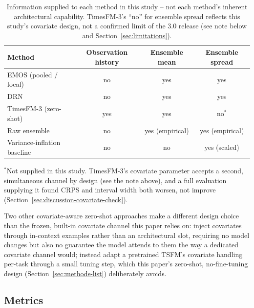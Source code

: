 \begin{table}[htbp]
\centering
\caption{Information supplied to each method in this study -- not each
method's inherent architectural capability. TimesFM-3's ``no'' for
ensemble spread reflects this study's covariate design, not a confirmed
limit of the 3.0 release (see note below and Section~\ref{sec:limitations}).}
\label{tab:info-channels}
\begin{tabular}{lccc}
\toprule
Method & Observation history & Ensemble mean & Ensemble spread \\
\midrule
EMOS (pooled / local) & no & yes & yes \\
DRN & no & yes & yes \\
TimesFM-3 (zero-shot) & yes & yes & no$^{\ast}$ \\
Raw ensemble & no & yes (empirical) & yes (empirical) \\
Variance-inflation baseline & no & no & yes (scaled) \\
\bottomrule
\end{tabular}

\smallskip
{\small $^{\ast}$Not supplied in this study. TimesFM-3's covariate
parameter accepts a second, simultaneous channel by design (see the note
above), and a full evaluation supplying it found CRPS and interval width
both worsen, not improve (Section~\ref{sec:discussion-covariate-check}).}
\end{table}

Two other covariate-aware zero-shot approaches make a different design
choice than the frozen, built-in covariate channel this paper relies on:
\citet{auer_2025_icl_covariates} inject covariates through in-context
examples rather than an architectural slot, requiring no model changes
but also no guarantee the model attends to them the way a dedicated
covariate channel would; \citet{qin_2025_cora} instead adapt a pretrained
TSFM's covariate handling per-task through a small tuning step, which
this paper's zero-shot, no-fine-tuning design (Section~\ref{sec:methods-list})
deliberately avoids.

\subsection{Metrics}
\label{sec:metrics}

